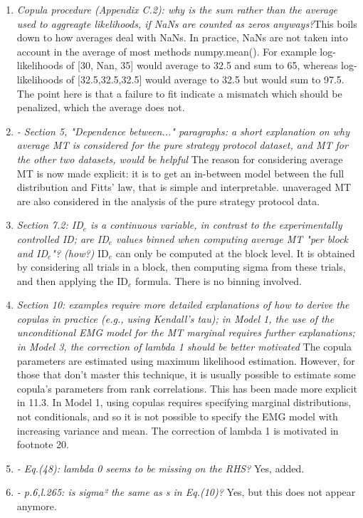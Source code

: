 \documentclass{article}
\begin{document}
\begin{enumerate}
    \item \textit{Copula procedure (Appendix C.2): why is the sum rather than the average used to aggreagte likelihoods, if NaNs are counted as zeros anyways?}This boils down to how averages deal with NaNs. In practice, NaNs are not taken into account in the average of most methods \eg numpy.mean(). For example log-likelihoods of [30, Nan, 35] would average to 32.5 and sum to 65, whereas log-likelihoods of [32.5,32.5,32.5] would average to 32.5 but would sum to 97.5. The point here is that a failure to fit indicate a mismatch which should be penalized, which the average does not.
    \item \textit{- Section 5, "Dependence between..." paragraphs: a short explanation on why average MT is considered for the pure strategy protocol dataset, and MT for the other two datasets, would be helpful} The reason for considering average MT is now made explicit: it is to get an in-between model between the full distribution and Fitts' law, that is simple and interpretable. unaveraged MT are also considered in the analysis of the pure strategy protocol data.
    \item \textit{Section 7.2: ID$_e$ is a continuous variable, in contrast to the experimentally controlled ID; are ID$_e$ values binned when computing average MT "per block and ID$_e$"? (how?)} ID$_e$ can only be computed at the block level. It is obtained by considering all trials in a block, then computing sigma from these trials, and then applying the ID$_e$ formula. There is no binning involved.
    \item \textit{Section 10: examples require more detailed explanations of how to derive the copulas in practice (e.g., using Kendall's tau); in Model 1, the use of the unconditional EMG model for the MT marginal requires further explanations; in Model 3, the correction of lambda 1 should be better motivated} The copula parameters are estimated using maximum likelihood estimation. However, for those that don't master this technique, it is usually possible to estimate some copula's parameters from rank correlations. This has been made more explicit in 11.3. In Model 1, using copulas requires specifying marginal distributions, not conditionals, and so it is not possible to specify the EMG model with increasing variance and mean. The correction of lambda 1 is motivated in footnote 20.
    \item \textit{- Eq.(48): lambda 0 seems to be missing on the RHS?} Yes, added.
    \item \textit{- p.6,l.265: is sigma² the same as s in Eq.(10)?} Yes, but this does not appear anymore.

\end{enumerate}
\end{document}
